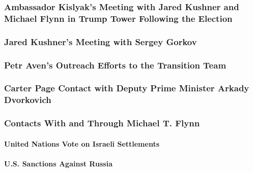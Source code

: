 \subsubsection{Ambassador Kislyak's Meeting with Jared Kushner and Michael Flynn in Trump Tower Following the Election}

\subsubsection{Jared Kushner's Meeting with Sergey Gorkov}

\subsubsection{Petr Aven's Outreach Efforts to the Transition Team}

\subsubsection{Carter Page Contact with Deputy Prime Minister Arkady Dvorkovich}

\subsubsection{Contacts With and Through Michael T. Flynn}

\paragraph{United Nations Vote on Israeli Settlements}

\paragraph{U.S. Sanctions Against Russia}
